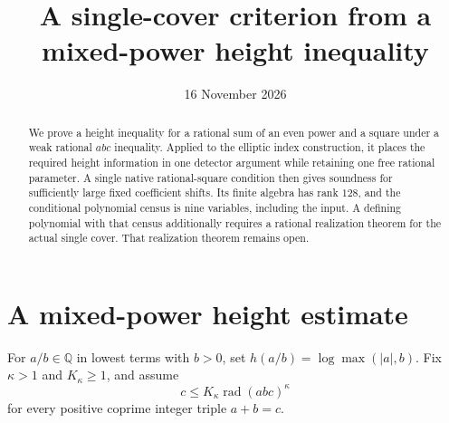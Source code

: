 \documentclass[11pt,a4paper]{article}
\title{A single-cover criterion from a mixed-power height inequality}
\author{}\date{16 November 2026}
\newcommand{\Q}{\mathbb Q}\newcommand{\Z}{\mathbb Z}
\DeclareMathOperator{\rad}{rad}
\begin{document}
\maketitle

\begin{abstract}
We prove a height inequality for a rational sum of an even power and a
square under a weak rational \(abc\) inequality. Applied to the elliptic
index construction, it places the required height information in one
detector argument while retaining one free rational parameter. A single
native rational-square condition then gives soundness for sufficiently
large fixed coefficient shifts. Its finite algebra has rank \(128\),
and the conditional polynomial census is nine variables, including the
input. A defining polynomial with that census additionally requires a
rational realization theorem for the actual single cover. That realization theorem remains open.
\end{abstract}

\section{A mixed-power height estimate}

For \(a/b\in\Q\) in lowest terms with \(b>0\), set
\(h(a/b)=\log\max(|a|,b)\).
Fix \(\kappa>1\) and \(K_\kappa\ge1\), and assume
\begin{equation}\label{eq:abc}
 c\le K_\kappa\rad(abc)^\kappa
\end{equation}
for every positive coprime integer triple \(a+b=c\).
\end{document}
